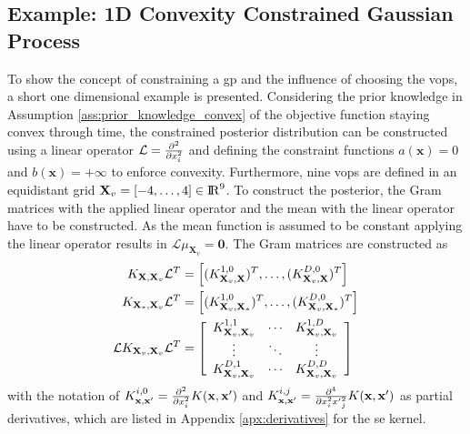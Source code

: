 \subsection{Example: 1D Convexity Constrained Gaussian Process}

To show the concept of constraining a \gls{gp} and the influence of choosing the \glspl{vop}, a short one dimensional example is presented. Considering the prior knowledge in Assumption \ref{ass:prior_knowledge_convex} of the objective function staying convex through time, the constrained posterior distribution can be constructed using a linear operator $\mathcal{L} = \frac{\partial^2}{\partial x_i^2}$ and defining the constraint functions $a(\mathbf{x}) = 0$ and $b(\mathbf{x}) = +\infty$ to enforce convexity. Furthermore, nine \glspl{vop} are defined in an equidistant grid $\mathbf{X}_v = [-4, \dots, 4] \in \mathrm{I\!R}^9$. To construct the posterior, the Gram matrices with the applied linear operator and the mean with the linear operator have to be constructed. As the mean function is assumed to be constant applying the linear operator results in $\mathcal{L}\mu_{\mathbf{X}_v} = \mathbf{0}$. The Gram matrices are constructed as
\begin{align}
    K_{\mathbf{X},\mathbf{X}_v}\mathcal{L}^T &= \left[(K^{1,0}_{\mathrm{\mathbf{X}}_{v},\mathbf{X}})^T, \dots, (K^{D,0}_{\mathrm{\mathbf{X}}_{v},\mathbf{X}})^T \right]\label{eq:constrained_gram1}\\
    K_{\mathbf{X}_*,\mathbf{X}_v}\mathcal{L}^T &= \left[(K^{1,0}_{\mathrm{\mathbf{X}}_{v},\mathbf{X}_*})^T, \dots, (K^{D,0}_{\mathrm{\mathbf{X}}_{v},\mathbf{X}_*})^T \right] \label{eq:constrained_gram2}\\
    \mathcal{L}K_{\mathbf{X}_v,\mathbf{X}_v}\mathcal{L}^T &= \left[\begin{array}{ccc}
    K^{1,1}_{\mathrm{\mathbf{X}}_{v},\mathrm{\mathbf{X}}_{v}} & \cdots & K^{1,D}_{\mathrm{\mathbf{X}}_{v},\mathrm{\mathbf{X}}_{v}} \\
    \vdots & \ddots & \vdots\\
     K^{D,1}_{\mathrm{\mathbf{X}}_{v},\mathrm{\mathbf{X}}_{v}} & \cdots & K^{D,D}_{\mathrm{\mathbf{X}}_{v},\mathrm{\mathbf{X}}_{v}}
    \end{array}\right] \label{eq:constrained_gram3}
\end{align}
with the notation of $K^{i,0}_{\mathbf{x},\mathbf{x}'} = \frac{\partial^2}{\partial x_i^2}K(\mathbf{x},\mathbf{x}')$ and $K^{i,j}_{\mathbf{x},\mathbf{x}'} = \frac{\partial^4}{\partial x_i^2 {x'}_j^2}K(\mathbf{x},\mathbf{x}')$ as partial derivatives, which are listed in Appendix \ref{apx:derivatives} for the \gls{se} kernel.
